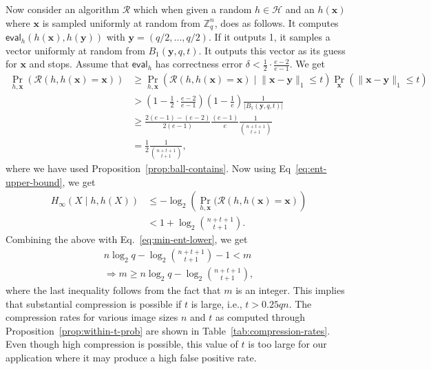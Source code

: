 \documentclass[pdflatex,sn-mathphys-num]{sn-jnl}
\theoremstyle{definition}
\newcommand{\vtr}[1]{\mathbf{#1}}
\newcommand{\norm}[1]{\lVert{#1}\rVert}
\begin{document}
Now consider an algorithm $\mathcal{R}$ which when given a random $h \in \mathcal{H}$ and an $h(\vtr{x})$ where $\vtr{x}$ is sampled uniformly at random from $\mathbb{Z}_q^n$, does as follows. It computes $\mathsf{eval}_h(h(\vtr{x}), h(\vtr{y}))$ with $\vtr{y} = (q/2, \ldots, q/2)$. If it outputs 1, it samples a vector uniformly at random from $B_1(\vtr{y}, q, t)$. It outputs this vector as its guess for $\vtr{x}$ and stops. Assume that $\mathsf{eval}_h$ has correctness error $\delta < \frac{1}{2}\cdot \frac{e-2}{e - 1}$. We get
\begin{align*}
    \Pr_{h, \vtr{x}} ( \mathcal{R}(h, h(\vtr{x}) = \vtr{x})) &\geq \Pr_{h, \vtr{x}} ( \mathcal{R}(h, h(\vtr{x}) = \vtr{x}) \mid \norm{\vtr{x} - \vtr{y}}_1 \leq t )  \Pr_{\vtr{x}}(\norm{\vtr{x} - \vtr{y}}_1 \leq t)\\
    &> \left(1-  \frac{1}{2}\cdot \frac{e-2}{e - 1}\right) \left(1 - \frac{1}{e}\right)  \frac{1}{|B_1(\vtr{y}, q, t)|}\\
    &\geq \frac{2(e-1) - (e - 2)}{2(e-1)} \frac{(e-1)}{e} \frac{1}{\binom{n+t + 1}{t + 1}}\\
    &= \frac{1}{2}\frac{1}{\binom{n+t+1}{t+1}},
\end{align*}
where we have used Proposition~\ref{prop:ball-contains}. Now using Eq~\eqref{eq:ent-upper-bound}, we get
\begin{align*}
 H_\infty(X \mid h, h(X)) &\leq -\log_2 \left(\Pr_{h, \vtr{x} } ( \mathcal{R}(h, h(\vtr{x}) = \vtr{x}) \right) \\
 &< 1 + \log_2 \binom{n + t + 1}{t + 1}. 
\end{align*}
Combining the above with Eq.~\eqref{eq:min-ent-lower}, we get
\begin{align}
    n\log_2 q - \log_2 \binom{n + t + 1}{t + 1} - 1 < m \nonumber\\
\Rightarrow m \geq n\log_2 q - \log_2 \binom{n + t + 1}{t + 1} \label{eq:m-l1},
\end{align}
where the last inequality follows from the fact that $m$ is an integer. This implies that substantial compression is possible if $t$ is large, i.e., $t > 0.25qn$. The compression rates for various image sizes $n$ and $t$ as computed through Proposition~\ref{prop:within-t-prob} are shown in Table~\ref{tab:compression-rates}. Even though high compression is possible, this value of $t$ is too large for our application where it may produce a high false positive rate.
\end{document}
